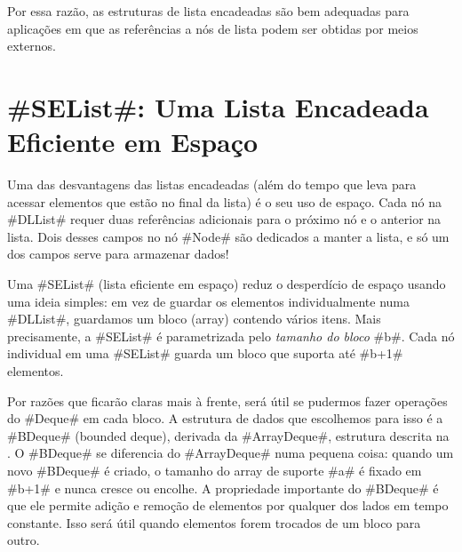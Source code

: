 Por essa razão, as estruturas de lista encadeadas são bem adequadas para aplicações em que 
as referências a nós de lista podem ser obtidas por meios externos.

\section{#SEList#: Uma Lista Encadeada Eficiente em Espaço}

%
%
Uma das desvantagens das listas encadeadas (além do tempo que leva para acessar
elementos que estão no final da lista) é o seu uso de espaço.  Cada nó
na #DLList# requer duas referências adicionais para o próximo nó
e o anterior na lista.  Dois desses campos no nó #Node# são dedicados
a manter a lista, e só um dos campos serve para armazenar dados!

Uma #SEList# (lista eficiente em espaço) reduz o desperdício de espaço usando
uma ideia simples: em vez de guardar os elementos individualmente numa #DLList#,
guardamos um bloco (array) contendo vários itens. Mais precisamente, a
#SEList# é parametrizada pelo \emph{tamanho do bloco} #b#. Cada nó individual
em uma #SEList# guarda um bloco que suporta até #b+1# elementos.

Por razões que ficarão claras mais à frente, será útil se pudermos fazer 
operações do #Deque# em cada bloco.  A estrutura de dados que escolhemos
para isso é a #BDeque# (bounded deque),
%
%
%
derivada da #ArrayDeque#,
estrutura descrita na .  O #BDeque# se diferencia do
#ArrayDeque# numa pequena coisa: quando um novo #BDeque# é criado, o tamanho
do array de suporte #a# é fixado em #b+1# e nunca cresce ou encolhe.
A propriedade importante do #BDeque# é que ele permite adição e remoção
de elementos por qualquer dos lados em tempo constante. Isso
será útil quando elementos forem trocados de um bloco para outro.

